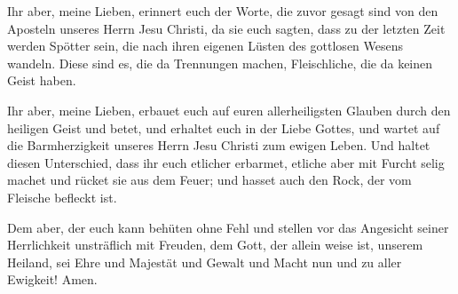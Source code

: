  Ihr aber, meine Lieben, erinnert euch der Worte, die
zuvor gesagt sind von den Aposteln unseres Herrn Jesu Christi,
 da sie euch sagten, dass zu der letzten Zeit werden
Spötter sein, die nach ihren eigenen Lüsten des gottlosen Wesens
wandeln.  Diese sind es, die da Trennungen machen,
Fleischliche, die da keinen Geist haben.

 Ihr aber, meine Lieben, erbauet euch auf euren
allerheiligsten Glauben durch den heiligen Geist und betet,
 und erhaltet euch in der Liebe Gottes, und wartet auf
die Barmherzigkeit unseres Herrn Jesu Christi zum ewigen Leben.
 Und haltet diesen Unterschied, dass ihr euch etlicher
erbarmet,  etliche aber mit Furcht selig machet und
rücket sie aus dem Feuer; und hasset auch den Rock, der vom Fleische
befleckt ist.

 Dem aber, der euch kann behüten ohne Fehl und stellen
vor das Angesicht seiner Herrlichkeit unsträflich mit Freuden,
 dem Gott, der allein weise ist, unserem Heiland, sei
Ehre und Majestät und Gewalt und Macht nun und zu aller Ewigkeit! Amen.
